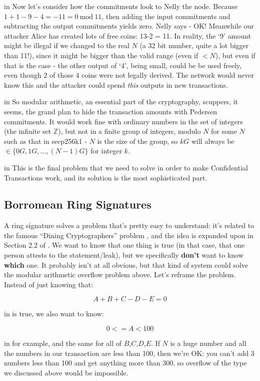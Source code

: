 \documentclass[10pt,a4paper]{article}
\begin{document}
 in \noindent Now let's consider how the commitments look to Nelly the node. Because $1 + 1 -9 - 4 = -11 = 0 \ \textrm{mod} \ 11$, then adding the input commitments and subtracting the output commitments yields zero. Nelly says - OK! Meanwhile our attacker Alice has created lots of free coins: 13-2 = 11. In reality, the `9' amount might be illegal if we changed to the real $N$ (a 32 bit number, quite a lot bigger than 11!), since it might be bigger than the valid range (even if $< N$), but even if that is the case - the other output of `4', being small, could be be used freely, even though 2 of those 4 coins were not legally derived. The network would never know this and the attacker could spend \textit{this} outputs in new transactions.

 in \noindent So modular arithmetic, an essential part of the cryptography, scuppers, it seems, the grand plan to hide the transaction amounts with Pedersen commitments. It would work fine with ordinary numbers in the set of integers (the infinite set $\mathbb{Z}$), but not in a finite group of integers, modulo $N$ for some $N$ such as that in secp256k1 - $N$ is the size of the group, so $kG$ will always be $\in \{0G, 1G, \ldots ,(N-1)G\}$ for integer $k$.

 in \noindent This is the final problem that we need to solve in order to make Confidential Transactions work, and its solution is the most sophisticated part.

\subsection{Borromean Ring Signatures}

A ring signature solves a problem that's pretty easy to understand: it's related to the famous ``Dining Cryptographers'' problem \cite{chaum_dc}, and the idea is expanded upon in Section 2.2 of \cite{ms_ringsig}. We want to know that one thing is true (in that case, that one person attests to the statement/leak), but we specifically \textbf{don't} want to know \textbf{which} one. It probably isn't at all obvious, but that kind of system could solve the modular arithmetic overflow problem above. Let's reframe the problem. Instead of just knowing that:

\[A + B + C - D -E = 0\]

 in \noindent is true, we also want to know:

\[0 <= A < 100\]

 in \noindent for example, and the same for all of $B$,$C$,$D$,$E$. If $N$ is a huge number and all the numbers in our transaction are less than 100, then we're OK: you can't add 3 numbers less than 100 and get anything more than 300, so overflow of the type we discussed above would be impossible.
\end{document}
